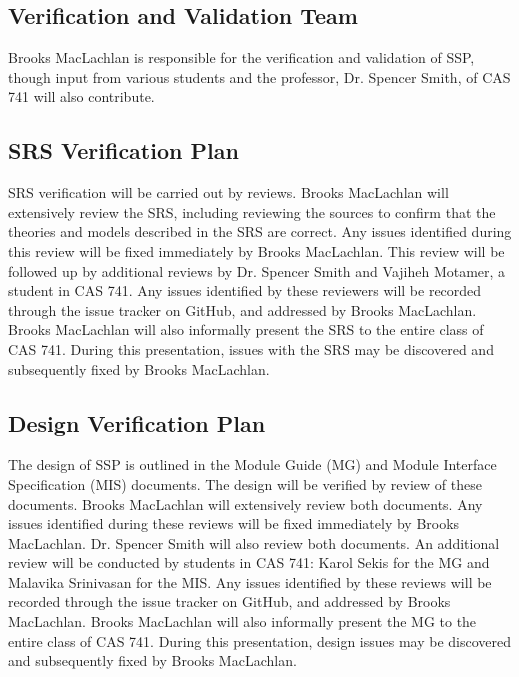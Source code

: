 \documentclass[12pt, titlepage]{article}
\begin{document}
\subsection{Verification and Validation Team}

\noindent Brooks MacLachlan is responsible for the verification and validation 
of SSP, though input from various students and the professor, Dr. Spencer 
Smith, of CAS 741 will also contribute.

\subsection{SRS Verification Plan}

\noindent SRS verification will be carried out by reviews. Brooks MacLachlan 
will extensively review the SRS, including reviewing the sources to confirm 
that the theories and models described in the SRS are correct. Any issues 
identified during this review will be fixed immediately by Brooks MacLachlan. 
This review will be followed up by additional reviews by Dr. Spencer Smith and 
Vajiheh Motamer, a student in CAS 741. Any issues identified by these reviewers 
will be recorded through the issue tracker on GitHub, and addressed by Brooks 
MacLachlan. Brooks MacLachlan will also informally present the SRS to the 
entire class of CAS 741. During this presentation, issues with the SRS may be 
discovered and subsequently fixed by Brooks MacLachlan.

\subsection{Design Verification Plan}

\noindent The design of SSP is outlined in the Module Guide (MG) and Module 
Interface Specification (MIS) documents. The design will be verified by review 
of these documents. Brooks MacLachlan will extensively review both documents. 
Any issues identified during these reviews will be fixed immediately by Brooks 
MacLachlan. Dr. Spencer Smith will also review both documents. An additional 
review will be conducted by students in CAS 741: Karol Sekis for the MG and 
Malavika Srinivasan for the MIS. Any issues identified by these reviews will be 
recorded through the issue tracker on GitHub, and addressed by Brooks 
MacLachlan. Brooks MacLachlan will also informally present the MG to the entire 
class of CAS 741. During this presentation, design issues may be discovered and 
subsequently fixed by Brooks MacLachlan.
\end{document}
